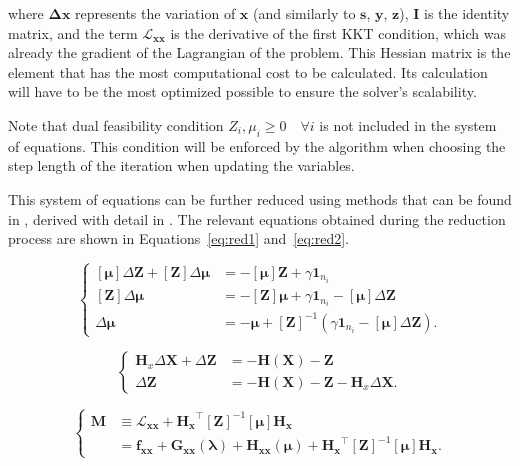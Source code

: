 where $\bm{\Delta x}$ represents the variation of $\bm{x}$ (and similarly to $\bm{s}$, $\bm{y}$, $\bm{z}$), $\bm{I}$ is the identity matrix, and the term  
$\bm{\mathcal{L}_{xx}}$ is the derivative of the first KKT condition, which was already the gradient of the Lagrangian of the problem. This Hessian matrix
is the element that has the most computational cost to be calculated. Its calculation will have to be the most optimized possible to ensure the solver's scalability.

Note that dual feasibility condition $Z_i, \mu_i \geq 0 \quad \forall i$ is not included in the system of equations. This condition will be enforced by the algorithm when choosing
the step length of the iteration when updating the variables.

This system of equations can be further reduced using methods that can be found in \cite{NocedalWright}, derived with detail in \cite{zimmerman2016mips}. 
The relevant equations obtained during the reduction process are shown in Equations~\eqref{eq:red1} and~\eqref{eq:red2}.

\newcommand{\ones}{\mathbf{1}}

\begin{equation}
    \begin{cases}
        [\bm{\mu}] \Delta \bm{Z} + [\bm{Z}] \Delta \bm{\mu} &= -[\bm{\mu}] \bm{Z} + \gamma \ones_{n_i}  \\
        [\bm{Z}] \Delta \bm{\mu} &= -[\bm{Z}] \bm{\mu} + \gamma \ones_{n_i}  - [\bm{\mu}] \Delta \bm{Z} \\
        \Delta \bm{\mu} &= -\bm{\mu} + [\bm{Z}]^{-1} (\gamma \ones_{n_i}  - [\bm{\mu}] \Delta \bm{Z}).
    \end{cases}
    \label{eq:red1}
\end{equation}  

\begin{equation}
    \begin{cases}
        \bm{H}_x \Delta \bm{X} + \Delta \bm{Z} &= -\bm{H}(\bm{X}) - \bm{Z} \\
        \Delta \bm{Z} &= -\bm{H}(\bm{X}) - \bm{Z} - \bm{H}_x \Delta \bm{X}.
    \end{cases}
    \label{eq:red2}
\end{equation}

\begin{equation}
    \begin{cases}
    \bm{M} &\equiv \bm{\mathcal{L}_{xx}} + \bm{H_x}^\top [\bm{Z}]^{-1} [\bm{\mu}] \bm{H}_{\bm{x}} \\
    &= \bm{f_{xx}} + \bm{G_{xx}}(\bm{\lambda}) + \bm{H_{xx}}(\bm{\mu}) + \bm{H_{x}}^\top [\bm{Z}]^{-1} [\bm{\mu}] \bm{H_x}.
    \end{cases}
    \label{eq:red3}
\end{equation}

